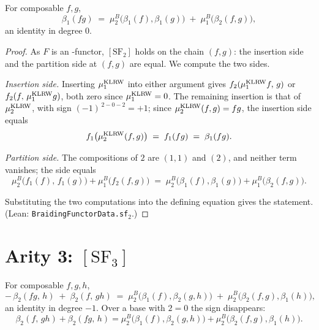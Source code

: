 \begin{theorem}\label{thm:sf2}
  For composable $f, g$,
  \[
    \beta_1(fg) \;=\; \mu^B_2\big(\beta_1(f), \beta_1(g)\big)
      \;+\; \mu^B_1\big(\beta_2(f,g)\big),
  \]
  an identity in degree $0$.
\end{theorem}

\begin{proof}
  As $F$ is an \Ainf-functor, $[\mathrm{SF}_2]$ holds on the chain $(f,g)$:
  the insertion side and the partition side at $(f,g)$ are equal. We compute
  the two sides.

  \emph{Insertion side.} Inserting $\mu^{\operatorname{KLRW}}_1$ into either argument gives
  $f_2(\mu^{\operatorname{KLRW}}_1 f,\, g)$ or $f_2(f,\, \mu^{\operatorname{KLRW}}_1 g)$, both zero since
  $\mu^{\operatorname{KLRW}}_1 = 0$. The remaining insertion is that of $\mu^{\operatorname{KLRW}}_2$,
  with sign $(-1)^{\,2-0-2} = +1$; since $\mu^{\operatorname{KLRW}}_2(f,g) = fg$, the
  insertion side equals
  \[
    f_1\big(\mu^{\operatorname{KLRW}}_2(f,g)\big) \;=\; f_1(fg) \;=\; \beta_1(fg).
  \]

  \emph{Partition side.} The compositions of $2$ are $(1,1)$ and $(2)$, and
  neither term vanishes; the side equals
  \[
    \mu^B_2\big(f_1(f),\, f_1(g)\big) + \mu^B_1\big(f_2(f,g)\big)
    \;=\; \mu^B_2\big(\beta_1(f), \beta_1(g)\big)
      + \mu^B_1\big(\beta_2(f,g)\big).
  \]

  Substituting the two computations into the defining equation gives the
  statement. (Lean: \texttt{BraidingFunctorData.sf}$_2$.)
\end{proof}

\section{Arity 3: \texorpdfstring{$[\mathrm{SF}_3]$}{[SF3]}}

\begin{theorem}\label{thm:sf3}
  For composable $f, g, h$,
  \[
    -\,\beta_2(fg,\, h) \;+\; \beta_2(f,\, gh)
    \;=\; \mu^B_2\big(\beta_1(f), \beta_2(g,h)\big)
      \;+\; \mu^B_2\big(\beta_2(f,g), \beta_1(h)\big),
  \]
  an identity in degree $-1$. Over a base with $2 = 0$ the sign disappears:
  \[
    \beta_2(f,\, gh) + \beta_2(fg,\, h)
    = \mu^B_2\big(\beta_1(f), \beta_2(g,h)\big)
      + \mu^B_2\big(\beta_2(f,g), \beta_1(h)\big).
  \]
\end{theorem}

